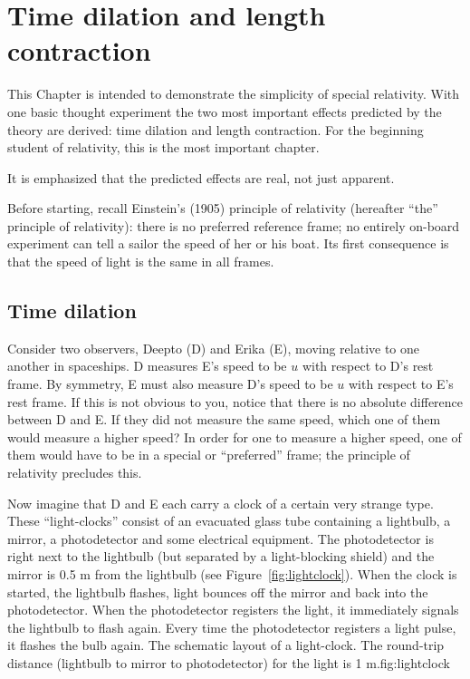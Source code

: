 \chapter{Time dilation and length contraction}
\label{chap:time}

This Chapter is intended to demonstrate the simplicity of special
relativity.  With one basic thought experiment the two most important
effects predicted by the theory are derived: time dilation and length
contraction.  For the beginning student of relativity, this is the
most important chapter.

It is emphasized that the predicted effects are real, not just
apparent.

Before starting, recall Einstein's (1905) principle of relativity
(hereafter ``the'' principle of relativity): there is no preferred
reference frame; no entirely on-board experiment can tell a sailor the
speed of her or his boat.  Its first consequence is that the speed of
light is the same in all frames.


\section{Time dilation}
\label{sec:timedilation}

Consider two observers, Deepto (D) and Erika (E), moving relative to
one another in spaceships.  D measures E's speed to be $u$ with
respect to D's rest frame.  By symmetry, E must also measure D's speed
to be $u$ with respect to E's rest frame.  If this is not obvious to
you, notice that there is no absolute difference between D and E.  If
they did not measure the same speed, which one of them would measure a
higher speed?  In order for one to measure a higher speed, one of them
would have to be in a special or ``preferred'' frame; the principle of
relativity precludes this.

Now imagine that D and E each carry a clock of a certain very strange
type.  These ``light-clocks'' consist of an
evacuated glass tube containing a lightbulb, a mirror, a photodetector
and some electrical equipment.  The photodetector is right next to the
lightbulb (but separated by a light-blocking shield) and the mirror is
0.5 m from the lightbulb (see Figure~\ref{fig:lightclock}).  When the
clock is started, the lightbulb flashes, light bounces off the mirror
and back into the photodetector.  When the photodetector registers the
light, it immediately signals the lightbulb to flash again.  Every
time the photodetector registers a light pulse, it flashes the bulb
again.
%
{The schematic layout of a light-clock.  The round-trip distance
(lightbulb to mirror to photodetector) for the light is 1 m.}{fig:lightclock}

